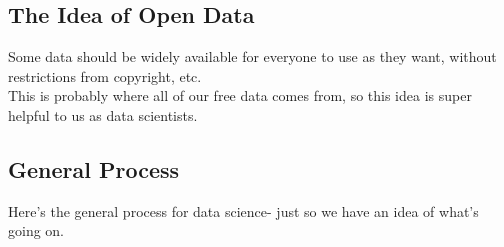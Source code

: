 \documentclass[english, 10pt]{article}
\begin{document}
\subsection{The Idea of Open Data}

Some data should be widely available for everyone to use as they want, without restrictions from copyright, etc.\\

This is probably where all of our free data comes from, so this idea is super helpful to us as data scientists.

\subsection{General Process}

Here's the general process for data science- just so we have an idea of what's going on.\\



\end{document}
